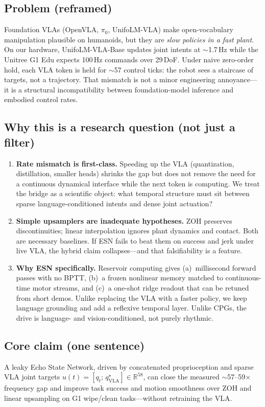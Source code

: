 \documentclass[conference]{IEEEtran}
\begin{document}
\subsection{Problem (reframed)}
Foundation VLAs (OpenVLA, $\pi_0$, UnifoLM-VLA) make open-vocabulary manipulation plausible on humanoids, but they are \emph{slow policies in a fast plant}.
On our hardware, UnifoLM-VLA-Base updates joint intents at $\sim$1.7\,Hz while the Unitree G1 Edu expects 100\,Hz commands over 29\,DoF.
Under naive zero-order hold, each VLA token is held for $\sim$57 control ticks: the robot sees a staircase of targets, not a trajectory.
That mismatch is not a minor engineering annoyance---it is a structural incompatibility between foundation-model inference and embodied control rates.

\subsection{Why this is a research question (not just a filter)}
\begin{enumerate}
    \item \textbf{Rate mismatch is first-class.}
        Speeding up the VLA (quantization, distillation, smaller heads) shrinks the gap but does not remove the need for a continuous dynamical interface while the next token is computing.
        We treat the bridge as a scientific object: what temporal structure must sit between sparse language-conditioned intents and dense joint actuation?
    \item \textbf{Simple upsamplers are inadequate hypotheses.}
        ZOH preserves discontinuities; linear interpolation ignores plant dynamics and contact.
        Both are necessary baselines. If ESN fails to beat them on success and jerk under live VLA, the hybrid claim collapses---and that falsifiability is a feature.
    \item \textbf{Why ESN specifically.}
        Reservoir computing gives (a)~millisecond forward passes with no BPTT, (b)~a frozen nonlinear memory matched to continuous-time motor streams, and (c)~a one-shot ridge readout that can be retuned from short demos.
        Unlike replacing the VLA with a faster policy, we keep language grounding and add a reflexive temporal layer.
        Unlike CPGs, the drive is language- and vision-conditioned, not purely rhythmic.
\end{enumerate}

\subsection{Core claim (one sentence)}
A leaky Echo State Network, driven by concatenated proprioception and sparse VLA joint targets $u(t)=[q_t;\,q^\star_{\mathrm{VLA}}]\in\mathbb{R}^{58}$, can close the measured $\sim$57--59$\times$ frequency gap and improve task success and motion smoothness over ZOH and linear upsampling on G1 wipe/clean tasks---without retraining the VLA.
\end{document}
